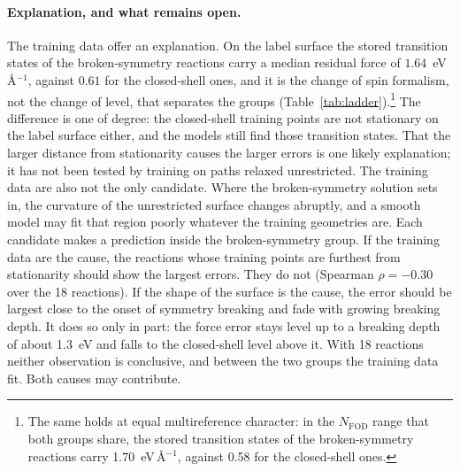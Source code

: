 \paragraph{Explanation, and what remains open.} The training data offer
an explanation. On the label surface the stored transition states of
the broken-symmetry reactions carry a median residual force of
$1.64$~eV\,\AA$^{-1}$, against $0.61$ for the closed-shell ones, and it
is the change of spin formalism, not the change of level, that
separates the groups (Table~\ref{tab:ladder}).\footnote{The same holds
at equal multireference character: in the $N_\mathrm{FOD}$ range that
both groups share, the stored transition states of the broken-symmetry
reactions carry 1.70~eV\,\AA$^{-1}$, against 0.58 for the closed-shell
ones.} The difference is one of
degree: the closed-shell training points are not stationary on the
label surface either, and the models still find those transition
states. That the larger distance from stationarity causes the larger
errors is one likely explanation; it has not been tested by training on
paths relaxed unrestricted. The training data are also not the only
candidate. Where the broken-symmetry solution sets in, the curvature of
the unrestricted surface changes abruptly, and a smooth model may fit
that region poorly whatever the training geometries are. Each candidate makes a prediction inside the broken-symmetry group. If
the training data are the cause, the reactions whose training points
are furthest from stationarity should show the largest errors. They do
not (Spearman $\rho = -0.30$ over the 18 reactions). If the shape of the
surface is the cause, the error should be largest close to the onset of
symmetry breaking and fade with growing breaking depth. It does so only
in part: the force error stays level up to a breaking depth of about
1.3~eV and falls to the closed-shell level above it. With 18 reactions
neither observation is conclusive, and between the two groups the
training data fit. Both causes may contribute.

